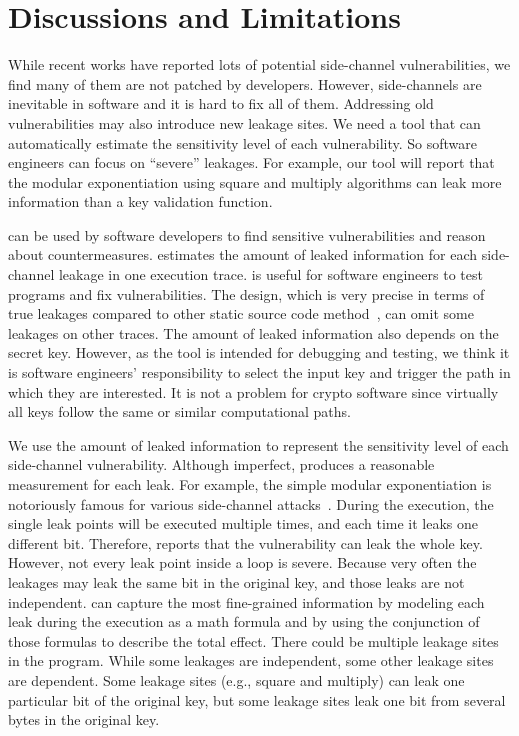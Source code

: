 \section{Discussions and Limitations}
While recent works have reported lots
of potential side-channel vulnerabilities, we find many of them are not patched by
developers.
However, side-channels are inevitable in software and it is hard to fix all of them. 
Addressing old vulnerabilities may also introduce new leakage
sites. We need a
tool that can automatically estimate the sensitivity level of each vulnerability.
So software engineers can focus on
``severe'' leakages. For example, our tool will report that 
the modular exponentiation using square and multiply algorithms can
leak more information than a key validation function.

\tool{} can be used by software developers to find sensitive vulnerabilities
and reason about countermeasures.
\tool{} estimates the amount of leaked information for each side-channel leakage
in one execution trace. \tool{} is useful for software
engineers to test programs and fix vulnerabilities.
The design, which is very
precise in terms of true leakages compared to other static source code
method~\cite{197207,BacelarAlmeida:2013:FVS:2483313.2483334}, can omit some
leakages on other traces. The amount of leaked information also depends on the secret key.
However, as the tool is intended for debugging and testing,
we think it is software engineers' responsibility to select the input key and trigger 
the path in which they are interested. It is not a problem for crypto software 
since virtually all keys follow the same or similar computational paths.

We use the amount of leaked information to represent the sensitivity level of 
each side-channel vulnerability. Although imperfect, \tool{} produces a reasonable 
measurement for each leak. For example, the simple modular exponentiation is 
notoriously famous for various side-channel attacks~\cite{kocher1996timing}. 
During the execution, the single leak points will be executed multiple times, 
and each time it leaks one different bit. Therefore, \tool{} reports that the 
vulnerability can leak the whole key. However, not every leak point inside a 
loop is severe. Because very often the leakages may leak the same bit in the 
original key, and those leaks are not independent. \tool{} can capture the most 
fine-grained information by modeling each leak during the execution as a math 
formula and by using the conjunction of those formulas to describe the total effect. 
There could be multiple leakage sites in the program. While some leakages are independent, 
some other leakage sites are dependent. Some leakage sites (e.g., square and multiply) 
can leak one particular bit of the original key, but some leakage sites leak one bit 
from several bytes in the original key. 

